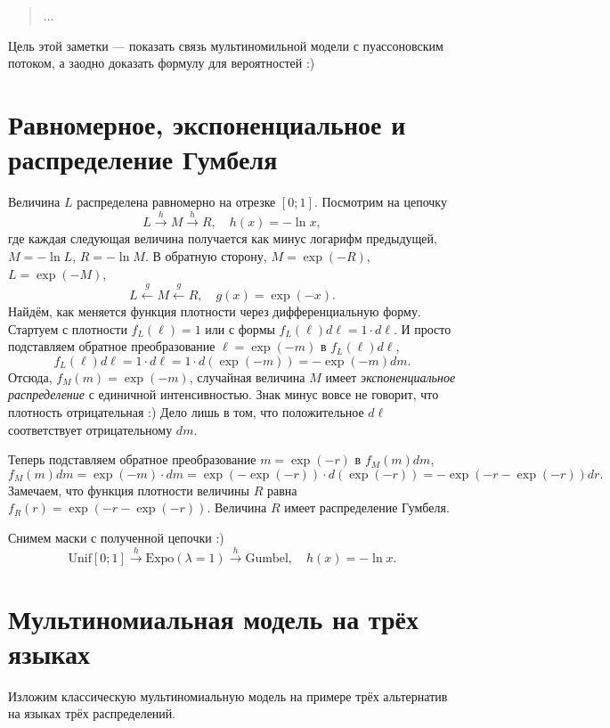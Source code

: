 \documentclass[12pt]{article}
\newcommand{\dUnif}{\mathrm{Unif}}
\newcommand{\dExpo}{\mathrm{Expo}} %
\newcommand{\dGumbel}{\mathrm{Gumbel}}
\begin{document}
\begin{verse}
    \begin{flushright}
        ...
    \end{flushright}
\end{verse}

Цель этой заметки — показать связь мультиномильной модели с пуассоновским потоком, а заодно доказать формулу для вероятностей :)


\section*{Равномерное, экспоненциальное и распределение Гумбеля}
Величина $L$ распределена равномерно на отрезке $[0;1]$. 
Посмотрим на цепочку 
\[
L \overset{h}{\rightarrow} M \overset{h}{\rightarrow} R, \quad h(x) = -\ln x,
\] 
где каждая следующая величина получается как минус логарифм предыдущей, $M = -\ln L$, $R = - \ln M$.
В обратную сторону, $M = \exp(-R)$, $L = \exp(- M)$,
\[
    L \overset{g}{\leftarrow} M \overset{g}{\leftarrow} R, \quad g(x) = \exp(-x).
\]
Найдём, как меняется функция плотности через дифференциальную форму.
Стартуем с плотности $f_L(\ell) = 1$ или с формы $f_L(\ell)d\ell = 1\cdot d\ell$.
И просто подставляем обратное преобразование $\ell = \exp(-m)$ в $f_L(\ell)d\ell$,
\[
f_L(\ell)d\ell = 1 \cdot d\ell = 1 \cdot d(\exp(-m)) = -\exp(-m) dm.
\]
Отсюда, $f_M(m)=\exp(-m)$, случайная величина $M$ имеет \emph{экспоненциальное распределение} с единичной интенсивностью. 
Знак минус вовсе не говорит, что плотность отрицательная :) 
Дело лишь в том, что положительное $d\ell$ соответствует отрицательному $dm$. 

Теперь подставляем обратное преобразование $m = \exp(-r)$ в $f_M(m)dm$,
\[
f_M(m)dm = \exp(-m) \cdot dm = \exp(-\exp(-r)) \cdot d(\exp(-r)) = -\exp(-r - \exp(-r)) dr.
\]
Замечаем, что функция плотности величины $R$ равна $f_R(r) = \exp(-r - \exp(-r))$.
Величина $R$ имеет распределение Гумбеля.

Снимем маски с полученной цепочки :)
\[
\dUnif[0; 1] \overset{h}{\rightarrow} \dExpo(\lambda = 1) \overset{h}{\rightarrow} \dGumbel, \quad h(x) = -\ln x.
\]

\section*{Мультиномиальная модель на трёх языках}

Изложим классическую мультиномиальную модель на примере трёх альтернатив на языках трёх распределений.
\end{document}
